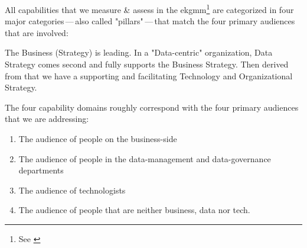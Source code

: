 %
%
\label{sec:the-four-capability-domains}
All capabilities that we measure \& assess in the \gls{ekgmm}\footnote{See \autocite{ekgmm}} are categorized
in four major categories\,---\,also called "pillars"\,---\,that match the four primary audiences that are involved:

The Business (Strategy) is leading.
In a "Data-centric" organization, Data Strategy comes second and
fully supports the Business Strategy.
Then derived from that we have a supporting and facilitating Technology and Organizational Strategy.

The four capability domains roughly correspond with the four primary audiences that we are addressing:

\begin{enumerate}
    \item The audience of people on the business-side
    \item The audience of people in the data-management and data-governance departments
    \item The audience of technologists
    \item The audience of people that are neither business, data nor tech.
\end{enumerate}
